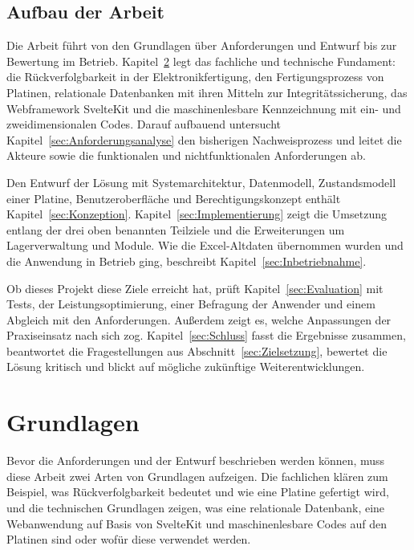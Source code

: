 \section{Aufbau der Arbeit}
\label{sec:Aufbau}
Die Arbeit führt von den Grundlagen über Anforderungen und Entwurf bis zur
Bewertung im Betrieb. Kapitel~\ref{sec:Grundlagen} legt das fachliche und
technische Fundament: die Rückverfolgbarkeit in der Elektronikfertigung, den
Fertigungsprozess von Platinen, relationale Datenbanken mit ihren Mitteln zur
Integritätssicherung, das Webframework SvelteKit und die maschinenlesbare
Kennzeichnung mit ein- und zweidimensionalen Codes. Darauf aufbauend untersucht
Kapitel~\ref{sec:Anforderungsanalyse} den bisherigen Nachweisprozess und leitet
die Akteure sowie die funktionalen und nichtfunktionalen Anforderungen ab.

Den Entwurf der Lösung mit Systemarchitektur, Datenmodell, Zustandsmodell einer
Platine, Benutzeroberfläche und Berechtigungskonzept enthält
Kapitel~\ref{sec:Konzeption}. Kapitel~\ref{sec:Implementierung} zeigt die
Umsetzung entlang der drei oben benannten Teilziele und die
Erweiterungen um Lagerverwaltung und Module. Wie die Excel-Altdaten übernommen
wurden und die Anwendung in Betrieb ging, beschreibt Kapitel~\ref{sec:Inbetriebnahme}.

Ob dieses Projekt diese Ziele erreicht hat, prüft Kapitel~\ref{sec:Evaluation} mit Tests, der
Leistungsoptimierung, einer Befragung der Anwender und einem Abgleich mit den
Anforderungen. Außerdem zeigt es, welche Anpassungen der Praxiseinsatz nach
sich zog. Kapitel~\ref{sec:Schluss} fasst die Ergebnisse zusammen, beantwortet
die Fragestellungen aus Abschnitt~\ref{sec:Zielsetzung}, bewertet die Lösung
kritisch und blickt auf mögliche zukünftige Weiterentwicklungen.


\chapter{Grundlagen}
\label{sec:Grundlagen}
Bevor die Anforderungen und der Entwurf beschrieben werden können, muss diese Arbeit zwei Arten
von Grundlagen aufzeigen. Die fachlichen klären zum Beispiel, was Rückverfolgbarkeit bedeutet und wie
eine Platine gefertigt wird, und die technischen Grundlagen zeigen, was eine relationale Datenbank, eine Webanwendung auf Basis von
SvelteKit und maschinenlesbare Codes auf den Platinen sind oder wofür diese verwendet werden.

